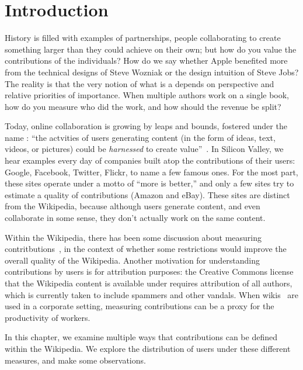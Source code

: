 
\section{Introduction}

History is filled with examples of partnerships, people collaborating
to create something larger than they could achieve on their own;
but how do you value the contributions of the individuals?
How do we say whether Apple benefited more from the technical
designs of Steve Wozniak or the design intuition of Steve Jobs?
The reality is that the very notion of what is a 
depends on perspective and relative priorities of importance.
When multiple authors work on a single book, how do you measure
who did the work, and how should the revenue be split?

Today, online collaboration is growing by leaps and bounds,
fostered under the name : ``the actvities of
users generating content (in the form of ideas, text,
videos, or pictures) could be \textit{harnessed} to
create value''~\cite{wiki:Web20}.
In Silicon Valley, we hear examples every day of companies
built atop the contributions of their users:
Google, Facebook, Twitter, Flickr, to name a few famous ones.
For the most part, these sites operate under a motto
of ``more is better,'' and only a few sites try to estimate
a quality of contributions (\eg Amazon and eBay).
These sites are distinct from the Wikipedia, because although
users generate content, and even collaborate in some sense,
they don't actually work on the same content.

Within the Wikipedia, there has been some discussion
about measuring contritbutions~\cite{Wales2005,Swartz2006},
in the context of whether some restrictions would improve
the overall quality of the Wikipedia.
Another motivation for understanding contributions by
users is for attribution purposes: the Creative Commons license
that the Wikipedia content is available under requires attribution
of all authors, which is currently taken to include spammers
and other vandals.
When wikis~\cite{Leuf2001} are used in a corporate setting,
measuring contributions can be a proxy for the productivity
of workers.

In this chapter, we examine multiple ways that contributions
can be defined within the Wikipedia.
We explore the distribution of users under these different measures,
and make some observations.

